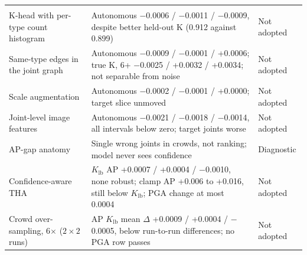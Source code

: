 \documentclass[11pt,a4paper]{article}
\newcommand{\Klb}{K_{\mathrm{lb}}}
\begin{document}
\begin{xltabular}{\linewidth}{@{}P{4.2cm}LP{2.15cm}@{}}
\addlinespace
{} \\
K-head with per-type count histogram & Autonomous $-$0.0006 / $-$0.0011 / $-$0.0009, despite better held-out K (0.912 against 0.899) & Not adopted \\
Same-type edges in the joint graph & Autonomous $-$0.0009 / $-$0.0001 / +0.0006; true K, 6+ $-$0.0025 / +0.0032 / +0.0034; not separable from noise & Not adopted \\
Scale augmentation & Autonomous $-$0.0002 / $-$0.0001 / +0.0000; target slice unmoved & Not adopted \\
Joint-level image features & Autonomous $-$0.0021 / $-$0.0018 / $-$0.0014, all intervals below zero; target joints worse & Not adopted \\
AP-gap anatomy & Single wrong joints in crowds, not ranking; model never sees confidence & Diagnostic \\
Confidence-aware THA & $\Klb$ AP +0.0007 / +0.0004 / $-$0.0010, none robust; clamp AP +0.006 to +0.016, still below $\Klb$; PGA change at most 0.0004 & Not adopted \\
Crowd over-sampling, 6$\times$ ($2 \times 2$ runs) & AP $\Klb$ mean $\Delta$ +0.0009 / +0.0004 / $-$0.0005, below run-to-run differences; no PGA row passes & Not adopted \\
\end{xltabular}



\end{document}
